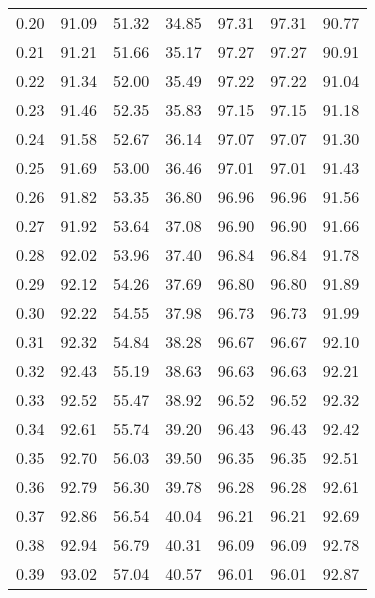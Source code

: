 \begin{tabular}{|c|c|c|c|c|c|c|}
      0.20 &     91.09 &     51.32 &      34.85 &   97.31 &      97.31 &         90.77 \\
      0.21 &     91.21 &     51.66 &      35.17 &   97.27 &      97.27 &         90.91 \\
      0.22 &     91.34 &     52.00 &      35.49 &   97.22 &      97.22 &         91.04 \\
      0.23 &     91.46 &     52.35 &      35.83 &   97.15 &      97.15 &         91.18 \\
      0.24 &     91.58 &     52.67 &      36.14 &   97.07 &      97.07 &         91.30 \\
      0.25 &     91.69 &     53.00 &      36.46 &   97.01 &      97.01 &         91.43 \\
      0.26 &     91.82 &     53.35 &      36.80 &   96.96 &      96.96 &         91.56 \\
      0.27 &     91.92 &     53.64 &      37.08 &   96.90 &      96.90 &         91.66 \\
      0.28 &     92.02 &     53.96 &      37.40 &   96.84 &      96.84 &         91.78 \\
      0.29 &     92.12 &     54.26 &      37.69 &   96.80 &      96.80 &         91.89 \\
      0.30 &     92.22 &     54.55 &      37.98 &   96.73 &      96.73 &         91.99 \\
      0.31 &     92.32 &     54.84 &      38.28 &   96.67 &      96.67 &         92.10 \\
      0.32 &     92.43 &     55.19 &      38.63 &   96.63 &      96.63 &         92.21 \\
      0.33 &     92.52 &     55.47 &      38.92 &   96.52 &      96.52 &         92.32 \\
      0.34 &     92.61 &     55.74 &      39.20 &   96.43 &      96.43 &         92.42 \\
      0.35 &     92.70 &     56.03 &      39.50 &   96.35 &      96.35 &         92.51 \\
      0.36 &     92.79 &     56.30 &      39.78 &   96.28 &      96.28 &         92.61 \\
      0.37 &     92.86 &     56.54 &      40.04 &   96.21 &      96.21 &         92.69 \\
      0.38 &     92.94 &     56.79 &      40.31 &   96.09 &      96.09 &         92.78 \\
      0.39 &     93.02 &     57.04 &      40.57 &   96.01 &      96.01 &         92.87 \\

\end{tabular}
